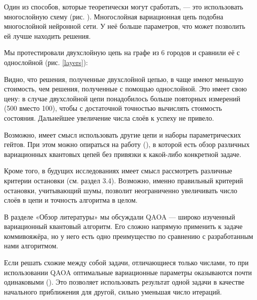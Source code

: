 Один из способов, которые теоретически могут сработать, --- это использовать многослойную схему (рис. ). Многослойная вариационная цепь подобна многослойной нейронной сети. У неё больше параметров, что может позволить ей лучше находить решения. 


Мы протестировали двухслойную цепь на графе из 6 городов и сравнили её с однослойной (рис. \ref{layers}):


Видно, что решения, полученные двухслойной цепью, в чаще имеют меньшую стоимость, чем решения, полученные с помощью однослойной. Это имеет свою цену: в случае двухслойной цепи понадобилось больше повторных измерений (500 вместо 100), чтобы с достаточной точностью вычислять стоимость состояния. Дальнейшее увеличение числа слоёв к успеху не привело. 

Возможно, имеет смысл использовать другие цепи и наборы параметрических гейтов. При этом можно опираться на работу \cite{Expressibility} (\citeyear{Expressibility}), в которой есть обзор различных вариационных квантовых цепей без привязки к какой-либо конкретной задаче.

Кроме того, в будущих исследованиях имеет смысл рассмотреть различные критерии остановки (см. раздел 3.4). 
Возможно, именно правильный критерий остановки, учитывающий шумы, позволит неограниченно увеличивать число слоёв в цепи и точность алгоритма в целом.




В разделе «Обзор литературы» мы обсуждали QAOA --- широко изученный вариационный квантовый алгоритм. Его сложно напрямую применить к задаче коммивояжёра, но у него есть одно преимущество по сравнению с разработанным нами алгоритмом. 

Если решать схожие между собой задачи, отличающиеся только числами, то при использовании QAOA оптимальные вариационные параметры оказываются почти одинаковыми \cite{Params} (\citeyear{Params}). Это позволяет использовать результат одной задачи в качестве начального приближения для другой, сильно уменьшая число итераций.

